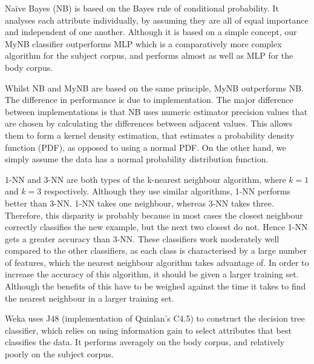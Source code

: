 \documentclass[10pt, a4paper]{article}
\begin{document}
Na\"ive Bayes (NB) is based on the Bayes rule of conditional probability. It analyses each attribute individually, by assuming they are all of equal importance and independent of one another. Although it is based on a simple concept, our MyNB classifier outperforms MLP which is a comparatively more complex algorithm for the subject corpus, and performs almost as well as MLP for the body corpus. 

Whilst NB and MyNB are based on the same principle, MyNB outperforms NB. The difference in performance is due to implementation. The major difference between implementations is that NB uses numeric estimator precision values that are chosen by calculating the differences between adjacent values. This allows them to form a kernel density estimation, that estimates a probability density function (PDF), as opposed to using a normal PDF. On the other hand, we simply assume the data has a normal probability distribution function. 

1-NN and 3-NN are both types of the k-nearest neighbour algorithm, where $k = 1$ and $k = 3$ respectively. Although they use similar algorithms, 1-NN performs better than 3-NN. 1-NN takes one neighbour, whereas 3-NN takes three. Therefore, this disparity is probably because in most cases the closest neighbour correctly classifies the new example, but the next two closest do not. Hence 1-NN gets a greater accuracy than 3-NN. These classifiers work moderately well compared to the other classifiers, as each class is characterised by a large number of features, which the nearest neighbour algorithm takes advantage of. In order to increase the accuracy of this algorithm, it should be given a larger training set. Although the benefits of this have to be weighed against the time it takes to find the nearest neighbour in a larger training set. 

Weka uses J48 (implementation of Quinlan's C4.5) to construct the decision tree classifier, which relies on using information gain to select attributes that best classifies the data. It performs averagely on the body corpus, and relatively poorly on the subject corpus.

\end{document}
